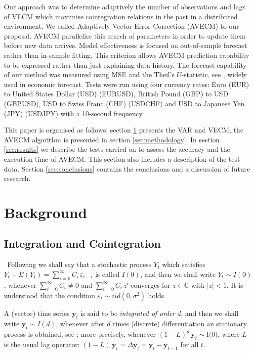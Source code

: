 Our approach was to determine adaptively the number of observations and lags of
VECM which maximise cointegration relations in the past in a distributed
environment.  We called Adaptively Vector Error Correction (AVECM) to our
proposal. AVECM parallelise this search of parameters in order to update them
before new data arrives. Model effectiveness is focused on out-of-sample
forecast rather than in-sample fitting. This criterion allows AVECM prediction
capability to be expressed rather than just explaining data history.  The
forecast capability of our method was measured using MSE and the Theil's
$U$-statistic, see \cite{theil1966}, widely used in economic forecast. Tests
were run using four currency rates: Euro (EUR) to United States Dollar (USD)
(EURUSD), British Pound (GBP) to USD (GBPUSD), USD to Swiss Franc (CHF) (USDCHF)
and USD to Japanese Yen (JPY) (USDJPY) with a 10-second frequency.

This paper is organised as follows: section \ref{sec:background} presents the
VAR and VECM, the AVECM algorithm is presented in section \ref{sec:methodology}.
In section \ref{sec:results} we describe the tests carried on to assess the
accuracy and the execution time of AVECM.  This section also includes a
description of the test data.  Section \ref{sec:conclusions} contains the
conclusions and a discussion of future research.

\section{Background}
\label{sec:background}

\subsection{Integration and Cointegration}\label{sec:coint}\  
Following \cite{johansen1995} we shall say that a stochastic process
$Y_t$ which satisfies $Y_t-E(Y_t) = \sum_{i=0}^\infty C_i\,\varepsilon_{t-i}$ is
called $I(0)$, and then we shall write $Y_t\sim I(0)$, whenever
$\sum_{i=0}^\infty C_i \neq 0$ and $\sum_{i=0}^\infty C_i\,z^i$ converges for
$z\in\mathbb{C}$ with $|z|<1$.  It is understood that the condition
$\varepsilon_t\sim iid(0,\sigma^2)$ holds.

A (vector) time series $\mathbf{y}_t$ is said to be {\em integrated of order\/}
$d$, and then we shall write $\mathbf{y}_t\sim I(d)$, whenever after $d$ times
(discrete) differentiation an stationary process is
obtained, see \cite{banerjee1993}; more precisely, whenever
$(1-L)^d\,\mathbf{y}_t\sim\text{I(0)}$, where $L$ is the usual lag operator:
$(1-L)\,\mathbf{y}_t = \Delta\mathbf{y}_t = \mathbf{y}_t-\mathbf{y}_{t-1}$ for
all $t$.  

